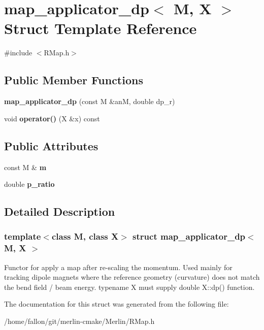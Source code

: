 \hypertarget{structmap__applicator__dp}{}\section{map\+\_\+applicator\+\_\+dp$<$ M, X $>$ Struct Template Reference}
\label{structmap__applicator__dp}


{\ttfamily \#include $<$R\+Map.\+h$>$}

\subsection*{Public Member Functions}
\begin{DoxyCompactItemize}
\item 
\mbox{\label{structmap__applicator__dp_a5459fea5f0721b189edf06b0800bac08}} 
{\bfseries map\+\_\+applicator\+\_\+dp} (const M \&anM, double dp\+\_\+r)
\item 
\mbox{\label{structmap__applicator__dp_a6ff7844ec3810e18eb0d09efd92feafb}} 
void {\bfseries operator()} (X \&x) const
\end{DoxyCompactItemize}
\subsection*{Public Attributes}
\begin{DoxyCompactItemize}
\item 
\mbox{\label{structmap__applicator__dp_ae48209fc2390864e9a3fe110572830a3}} 
const M \& {\bfseries m}
\item 
\mbox{\label{structmap__applicator__dp_ab9c8d99752d2ddbbd9edddf5ac3a2add}} 
double {\bfseries p\+\_\+ratio}
\end{DoxyCompactItemize}


\subsection{Detailed Description}
\subsubsection*{template$<$class M, class X$>$\newline
struct map\+\_\+applicator\+\_\+dp$<$ M, X $>$}

Functor for apply a map after re-\/scaling the momentum. Used mainly for tracking dipole magnets where the reference geometry (curvature) does not match the bend field / beam energy. typename X must supply double X\+::dp() function. 

The documentation for this struct was generated from the following file\+:\begin{DoxyCompactItemize}
\item 
/home/fallon/git/merlin-\/cmake/\+Merlin/R\+Map.\+h\end{DoxyCompactItemize}
